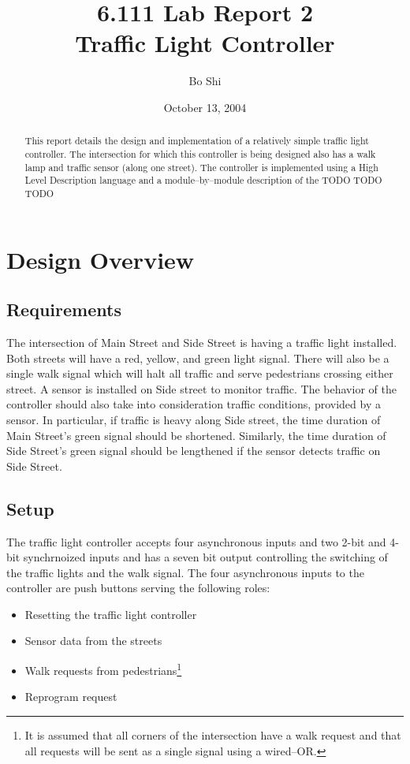 \documentclass{article}
\author{Bo Shi}
\title{6.111 Lab Report 2 \\ Traffic Light Controller}
\date{October 13, 2004}
\begin{document}
\maketitle

\begin{abstract}
This report details the design and implementation of a relatively simple
traffic light controller.  The intersection for which this controller is being
designed also has a walk lamp and traffic sensor (along one street).  The controller
is implemented using a High Level Description language and a module--by--module
description of the  TODO TODO TODO
\end{abstract}

\newpage
\tableofcontents

\newpage
\listoffigures 
\listoftables 

\newpage
\section{Design Overview}
	\subsection{Requirements}
		The intersection of Main Street and Side Street is having a traffic
		light installed.  Both streets will have a red, yellow, and green light
		signal.  There will also be a single walk signal which will halt all
		traffic and serve pedestrians crossing either street.  A sensor is
		installed on Side street to monitor traffic.  The behavior of the
		controller should also take into consideration traffic conditions,
		provided by a sensor.  In particular, if traffic is heavy along Side
		street, the time duration of Main Street's green signal should be
		shortened.  Similarly, the time duration of Side Street's green signal
		should be lengthened if the sensor detects traffic on Side Street.
		
	\subsection{Setup}
		The traffic light controller accepts four asynchronous inputs and two
		2-bit and 4-bit synchrnoized inputs and has a seven bit output
		controlling the switching of the traffic lights and the walk signal.
		The four asynchronous inputs to the controller are push buttons serving
		the following roles:
		\begin{itemize}
			\item Resetting the traffic light controller
			\item Sensor data from the streets
			\item Walk requests from pedestrians\footnote{It is assumed that all corners of the intersection have a walk request and that all requests will be sent as a single signal using a wired--OR.}
			\item Reprogram request
		\end{itemize}
\end{document}

